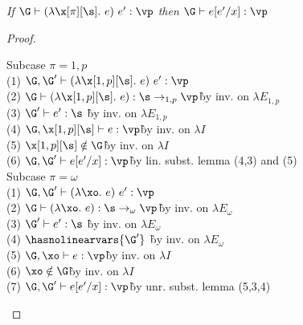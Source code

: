 \begin{lemma}
    \emph{If $\G \vdash (\lambda \x[\pi][\s].~e)~e' : \vp$ then $\G \vdash e[e'/x] : \vp$}
\end{lemma}

\begin{proof}
\begin{description}

\begin{tabbing}
    Subcase $\pi = 1,p$\\
    (1) $\G,\G' \vdash (\lambda \x[1,p][\s].~e)~e' : \vp$\\
    (2) $\G \vdash (\lambda \x[1,p][\s].~e) : \s \to_{1,p} \vp$\` by inv. on $\lambda E_{1,p}$\\
    (3) $\G' \vdash e' : \s$ \` by inv. on $\lambda E_{1,p}$\\
    (4) $\G,\x[1,p][\s] \vdash e : \vp $\`by inv. on $\lambda I$\\
    (5) $\x[1,p][\s] \notin \G$\`by inv. on $\lambda I$\\
    (6) $\G,\G' \vdash e[e'/x] : \vp$\` by lin. subst. lemma (4,3) and (5)\\
    Subcase $\pi = \omega$\\
    (1) $\G,\G' \vdash (\lambda \xo.~e)~e' : \vp$\\
    (2) $\G \vdash (\lambda \xo.~e) : \s \to_\omega \vp$\` by inv. on $\lambda E_\omega$\\
    (3) $\G' \vdash e' : \s$ \` by inv. on $\lambda E_\omega$\\
    (4) $\hasnolinearvars{\G'}$ \` by inv. on $\lambda E_\omega$\\
    (5) $\G,\xo \vdash e : \vp$\` by inv. on $\lambda I$\\
    (6) $\xo \notin \G$\` by inv. on $\lambda I$\\
    (7) $\G,\G' \vdash e[e'/x] : \vp$\` by unr. subst. lemma (5,3,4)\\
\end{tabbing}
\end{description}
\end{proof}


